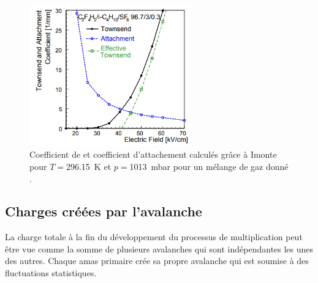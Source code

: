 \begin{figure}[ht!]
	\centering
	\includegraphics[width=0.62\textwidth]{RPC/tow.png}
	\captionsetup{type=subfigure}\caption{Coefficient de  et coefficient d'attachement calculés grâce à Imonte \cite{imonte} pour $T=$\SI{296.15}{\kelvin} et $p=$\SI{1013}{\milli\bar} pour un mélange de gaz donné \cite{Riegler:570462}.}
	\label{tow}
\end{figure}

\subsection{Charges créées par l'avalanche}
La charge totale à la fin du développement du processus de multiplication peut être vue comme la somme de plusieurs avalanches qui sont indépendantes les unes des autres. Chaque amas primaire crée sa propre avalanche qui est soumise à des fluctuations statistiques.


